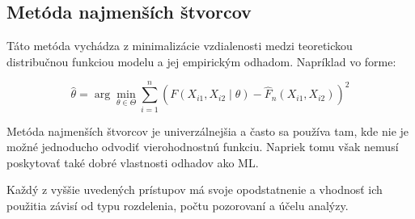 \subsection{Metóda najmenších štvorcov}\label{subsec:least_squares}

Táto metóda vychádza z minimalizácie vzdialenosti medzi teoretickou distribučnou funkciou modelu a jej empirickým odhadom. Napríklad vo forme:

\begin{equation}
\hat{\theta} = \arg\min_{\theta \in \Theta} \sum_{i=1}^{n} \left( F(X_{i1}, X_{i2} \mid \theta) - \hat{F}_n(X_{i1}, X_{i2}) \right)^2
\end{equation}

Metóda najmenších štvorcov je univerzálnejšia a často sa používa tam, kde nie je možné jednoducho odvodiť vierohodnostnú funkciu. Napriek tomu však nemusí poskytovať také dobré vlastnosti odhadov ako ML.

\vspace{1em}

Každý z vyššie uvedených prístupov má svoje opodstatnenie a vhodnosť ich použitia závisí od typu rozdelenia, počtu pozorovaní a účelu analýzy.
